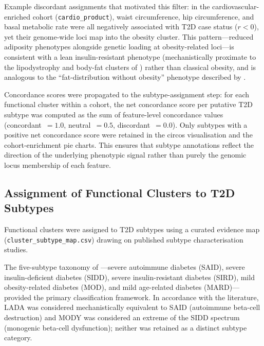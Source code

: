Example discordant assignments that motivated this filter: in the cardiovascular-enriched cohort (\texttt{cardio\_product}), waist circumference, hip circumference, and basal metabolic rate were all negatively associated with T2D case status ($r < 0$), yet their genome-wide loci map into the obesity cluster.
This pattern---reduced adiposity phenotypes alongside genetic loading at obesity-related loci---is consistent with a lean insulin-resistant phenotype (mechanistically proximate to the lipodystrophy and body-fat clusters of \citet{Suzuki2024}) rather than classical obesity, and is analogous to the ``fat-distribution without obesity'' phenotype described by \citet{Yaghootkar2014}.

Concordance scores were propagated to the subtype-assignment step: for each functional cluster within a cohort, the net concordance score per putative T2D subtype was computed as the sum of feature-level concordance values (concordant~$= 1.0$, neutral~$= 0.5$, discordant~$= 0.0$).
Only subtypes with a positive net concordance score were retained in the circos visualisation and the cohort-enrichment pie charts.
This ensures that subtype annotations reflect the direction of the underlying phenotypic signal rather than purely the genomic locus membership of each feature.

\subsection*{Assignment of Functional Clusters to T2D Subtypes}

Functional clusters were assigned to T2D subtypes using a curated evidence map (\texttt{cluster\_subtype\_map.csv}) drawing on published subtype characterisation studies.

The five-subtype taxonomy of \citet{Ahlqvist2018}---severe autoimmune diabetes (SAID), severe insulin-deficient diabetes (SIDD), severe insulin-resistant diabetes (SIRD), mild obesity-related diabetes (MOD), and mild age-related diabetes (MARD)---provided the primary classification framework.
In accordance with the literature, LADA was considered mechanistically equivalent to SAID (autoimmune beta-cell destruction) and MODY was considered an extreme of the SIDD spectrum (monogenic beta-cell dysfunction); neither was retained as a distinct subtype category.

